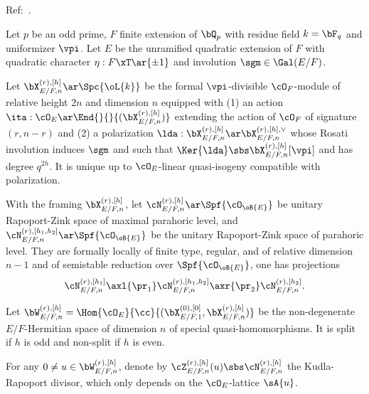 \documentclass[a4paper, twoside]{article}
\begin{document}
\confighead{}{}{}



Ref:~\cite{Cho2019,LRZ2024Quasi}.

\begin{stp}
	Let $p$ be an odd prime, $F$ finite extension of $\bQ_{p}$ with residue field $k=\bF_{q}$ and uniformizer $\vpi$. Let $E$ be the unramified quadratic extension of $F$ with quadratic character $\eta:F\xT\ar\{\pm1\}$ and involution $\sgm\in\Gal(E/F)$.


	Let $\bX_{E/F, n}^{(r),[h]}\ar\Spc{\oL{k}}$ be the formal $\vpi$-divisible $\cO_{F}$-module of relative height $2n$ and dimension $n$ equipped with (1) an action $\ita:\cO_{E}\ar\End{}{}{(\bX_{E/F,n}^{(r), [h]})}$ extending the action of $\cO_{F}$ of signature $(r,n-r)$ and (2) a polarization $\lda:\bX_{E/F,n}^{(r),[h]}\ar\bX_{E/F,n}^{(r),[h],\vee}$ whose Rosati involution induces $\sgm$ and such that $\Ker{\lda}\sbs\bX_{E/F,n}^{(r),[h]}[\vpi]$ and has degree $q^{2h}$. It is unique up to $\cO_{E}$-linear quasi-isogeny compatible with polarization.


	With the framing $\bX_{E/F,n}^{(r),[h]}$, let $\cN_{E/F,n}^{(r),[h]}\ar\Spf{\cO_{\oB{E}}}$ be unitary Rapoport-Zink space of maximal parahoric level, and $\cN_{E/F,n}^{(r),[h_{1},h_{2}]}\ar\Spf{\cO_{\oB{E}}}$ be the unitary Rapoport-Zink space of parahoric level. They are formally locally of finite type, regular, and of relative dimension $n-1$ and of semistable reduction over $\Spf{\cO_{\oB{E}}}$, one has projections
	\[
		\cN_{E/F,n}^{(r),[h_{1}]}\axl{\pr_{1}}\cN_{E/F,n}^{(r),[h_{1},h_{2}]}\axr{\pr_{2}}\cN_{E/F,n}^{(r),[h_{2}]}.
	\]


	Let $\bW_{E/F,n}^{(r),[h]}=\Hom{\cO_{E}}{\cc}{(\bX_{E/F,1}^{(0),[0]},\bX_{E/F,n}^{(r),[h]})}$ be the non-degenerate $E/F$-Hermitian space of dimension $n$ of special quasi-homomorphisms. It is split if $h$ is odd and non-split if $h$ is even.

	For any $0\neq u\in\bW_{E/F,n}^{(r),[h]}$, denote by $\cZ_{E/F,n}^{(r),[h]}(u)\sbs\cN_{E/F,n}^{(r),[h]}$ the Kudla-Rapoport divisor, which only depends on the $\cO_{E}$-lattice $\sA{u}$.

\end{stp}

\end{document}
